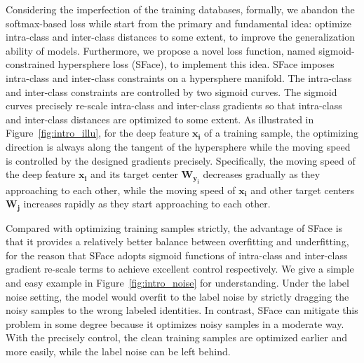 \documentclass[journal,comsoc]{IEEEtran}
\begin{document}
Considering the imperfection of the training databases, formally, we abandon the softmax-based loss while start from the primary and fundamental idea: optimize intra-class and inter-class distances to some extent, to improve the generalization ability of models. Furthermore, we propose a novel loss function, named sigmoid-constrained hypersphere loss (SFace), to implement this idea. SFace imposes intra-class and inter-class constraints on a hypersphere manifold. The intra-class and inter-class constraints are controlled by two sigmoid curves. The sigmoid curves precisely re-scale intra-class and inter-class gradients so that intra-class and inter-class distances are optimized to some extent. As illustrated in Figure~\ref{fig:intro_illu}, for the deep feature $\bm{{x_i}}$ of a training sample, the optimizing direction is always along the tangent of the hypersphere while the moving speed is controlled by the designed gradients precisely. Specifically, the moving speed of the deep feature $\bm{{x_i}}$ and its target center ${\bm{W_{{y_i}}}}$ decreases gradually as they approaching to each other, while the moving speed of $\bm{{x_i}}$ and other target centers ${\bm{W_{{j}}}}$ increases rapidly as they start approaching to each other.

Compared with optimizing training samples strictly, the advantage of SFace is that it provides a relatively better balance between overfitting and underfitting, for the reason that SFace adopts sigmoid functions of intra-class and inter-class gradient re-scale terms to achieve excellent control respectively. We give a simple and easy example in Figure~\ref{fig:intro_noise} for understanding. Under the label noise setting, the model would overfit to the label noise by strictly dragging the noisy samples to the wrong labeled identities. In contrast, SFace can mitigate this problem in some degree because it optimizes noisy samples in a moderate way. With the precisely control, the clean training samples are optimized earlier and more easily, while the label noise can be left behind. 
\end{document}
